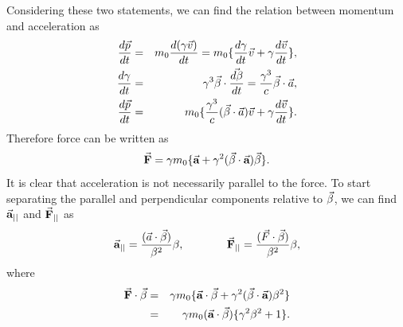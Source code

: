 \documentclass[a4paper,oneside,12pt]{report}
\numberwithin{equation}{chapter}
\begin{document}
Considering these two statements, we can find the relation between momentum and acceleration as 
\vspace{-15pt}
\begin{eqnarray}
    \deriv{\vecthree{p}}{t} &=& m_0 \deriv{(\gamma \vecthree{v})}{t} = m_0 \{  \deriv{\gamma}{t}\vecthree{v} + \gamma \deriv{\vecthree{v}}{t}   \} ,\\
    \deriv{\gamma}{t} &=& \gamma^3 \dotProd{\beta}{\deriv{\beta}{t}} = \frac{\gamma^3}{c} \dotProd{\beta}{a}   , \\
    \deriv{\vecthree{p}}{t}  &=& m_0 \{   \frac{\gamma^3}{c} (\dotProd{\beta}{a} )\vecthree{v} + \gamma \deriv{\vecthree{v}}{t}  \} .
    \vspace{-10pt}
\end{eqnarray}
\vspace{-30pt}
\newline
Therefore force can be written as
\vspace{-15pt}
\begin{equation} \label{eq:Frel}
    \vecthreeBF{F}  = \gamma m_0 \{ \vecthreeBF{a} + \gamma^2(\dotProd{\beta}{\textbf{a}})\vecthree{\beta} \} .
    \vspace{-10pt}
\end{equation}
\clearpage
It is clear that acceleration is not necessarily parallel to the force. 
To start separating the parallel and perpendicular components relative to $\vec{\beta}$, we can find $\vec{\textbf{a}}_{||}$ and $\vec{\textbf{F}}_{||}$ as
\vspace{-10pt}
\begin{equation} \label{eq:a_F_parallels}
    \begin{aligned}
        \vecthreeBF{a}_{||} = \frac{(\dotProd{a}{\beta})}{\beta^2}\beta  ,
    \end{aligned}
    \qquad \qquad
    \begin{aligned}
        \vecthreeBF{F}_{||} = \frac{(\dotProd{F}{\beta})}{\beta^2}\beta  ,
    \end{aligned}
    \vspace{-10pt}
\end{equation}
where 
\vspace{-10pt}
\begin{eqnarray}
    \dotProd{\textbf{F}}{\beta} &=& \gamma m_0 \{ \dotProd{\textbf{a}}{\beta} + \gamma^2(\dotProd{\beta}{\textbf{a}})\beta^2 \} \nonumber\\
                                &=& \gamma m_0 (\dotProd{\textbf{a}}{\beta}) \{ \gamma^2\beta^2  + 1\} .
                                \vspace{-10pt}
\end{eqnarray}
\end{document}
